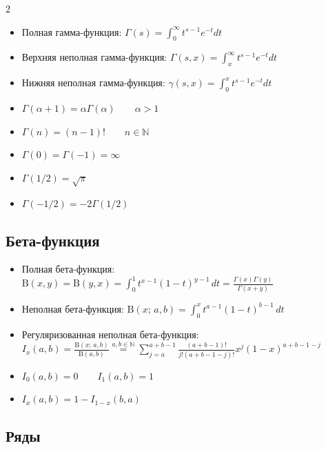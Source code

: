 \documentclass[landscape]{article}
\begin{document}
\begin{multicols*}{2}
\begin{itemize}
  \item Полная гамма-функция:
    $\displaystyle\Gamma(s) = \int_0^\infty t^{s-1} e^{-t}dt$
  \item Верхняя неполная гамма-функция:
    $\displaystyle\Gamma(s,x) = \int_x^\infty t^{s-1} e^{-t}dt$
  \item Нижняя неполная гамма-функция:
    $\displaystyle\gamma(s,x) = \int_0^x t^{s-1} e^{-t}dt$
  \item $\Gamma(\alpha + 1) = \alpha \Gamma(\alpha) \qquad \alpha>1$
  \item $\Gamma(n) = (n-1)! \qquad n \in \mathbb N$
  \item $\Gamma(0) = \Gamma(-1) = \infty$
  \item $\Gamma(1/2) = \sqrt{\pi}$
  \item $\Gamma(-1/2) = -2 \Gamma(1/2)$
\end{itemize}

\subsection{Бета-функция}
\label{sec:math:beta}

\begin{itemize}
  \item Полная бета-функция: $\text{B}(x,y) = \text{B}(y,x)
    = \displaystyle\int_0^1 t^{x-1}(1-t)^{y-1} \,dt
    = \displaystyle\frac{\Gamma(x)\Gamma(y)}{\Gamma(x+y)}$
\item Неполная бета-функция: $\text{B}(x;\,a,b)
    = \displaystyle\int_0^x t^{a-1}(1-t)^{b-1} \,dt$
  \item Регуляризованная неполная бета-функция: \\
    $I_x(a,b) = \displaystyle\frac{\text{B}(x;\,a,b)}{\text{B}(a,b)}
      \stackrel{a,b\in\mathbb N}{=}
      \sum_{j=a}^{a+b-1} \frac{(a+b-1)!}{j!(a+b-1-j)!}x^j(1-x)^{a+b-1-j}$
  \item $I_0(a,b) = 0 \qquad I_1(a,b) = 1$
  \item $I_x(a,b) = 1 - I_{1-x}(b,a)$
\end{itemize}

\subsection{Ряды}


\end{multicols*}
\end{document}

